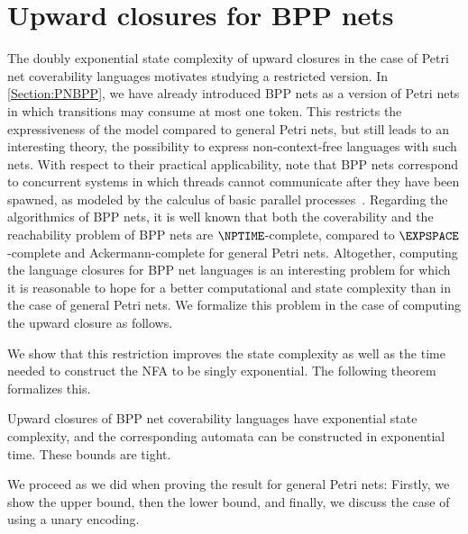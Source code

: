 \documentclass[../../diss.tex]{subfiles}
\begin{document}
\section{Upward closures for BPP nets}%
\label{Section:UCBPP}%

The doubly exponential state complexity of upward closures in the case of Petri net coverability languages motivates studying a restricted version.
In \cref{Section:PNBPP}, we have already introduced BPP nets as a version of Petri nets in which transitions may consume at most one token.
This restricts the expressiveness of the model compared to general Petri nets, but still leads to an interesting theory, \eg the possibility to express non-context-free languages with such nets.
With respect to their practical applicability, note that BPP nets correspond to concurrent systems in which threads cannot communicate after they have been spawned, as modeled by the calculus of basic parallel processes~\cite{Christensen93}.
Regarding the algorithmics of BPP nets, it is well known that both the coverability and the reachability problem of BPP nets are $\NPTIME$-complete, compared to $\EXPSPACE$-complete and Ackermann-complete for general Petri nets.
Altogether, computing the language closures for BPP net languages is an interesting problem for which it is reasonable to hope for a better computational and state complexity than in the case of general Petri nets.
We formalize this problem in the case of computing the upward closure as follows.

\begin{compproblem}
    \problemshort{($\BPPUC$)}
\end{compproblem}

We show that this restriction improves the state complexity as well as the time needed to construct the NFA to be singly exponential.
The following theorem formalizes this.

\begin{theorem}%
\label{Theorem:BPPUCGeneral}%
    Upward closures of BPP net coverability languages have exponential state complexity, and the corresponding automata can be constructed in exponential time. These bounds are tight.
\end{theorem}

We proceed as we did when proving the result for general Petri nets:
Firstly, we show the upper bound, then the lower bound, and finally, we discuss the case of using a unary encoding.
\end{document}
